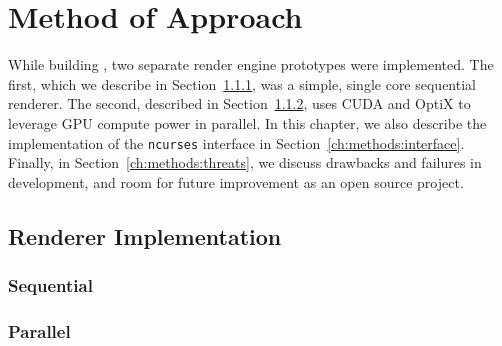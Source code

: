 %
%
%
\chapter{Method of Approach} \label{ch:methods}

While building \name, two separate render engine prototypes were implemented.
The first, which we describe in Section~\ref{ch:methods:renderer:sequential}, was a simple, single core sequential renderer.
The second, described in Section~\ref{ch:methods:renderer:parallel}, uses CUDA \cite{nvidia2011cuda} and OptiX \cite{parker2010optix} to leverage GPU compute power in parallel.
In this chapter, we also describe the implementation of the \texttt{ncurses} interface in Section~\ref{ch:methods:interface}.
Finally, in Section~\ref{ch:methods:threats}, we discuss drawbacks and failures in development, and room for future improvement as an open source project.


\section{Renderer Implementation} \label{ch:methods:renderer}

\subsection{Sequential} \label{ch:methods:renderer:sequential}

 \label{ch:methods:renderer:sequential:motivation}

 \label{ch:methods:renderer:sequential:libraries}

 \label{ch:methods:renderer:sequential:design}

 \label{ch:methods:renderer:sequential:proto}

 \label{ch:methods:renderer:sequential:takeaway}

\subsection{Parallel} \label{ch:methods:renderer:parallel}

 \label{ch:methods:renderer:parallel:motivation}

